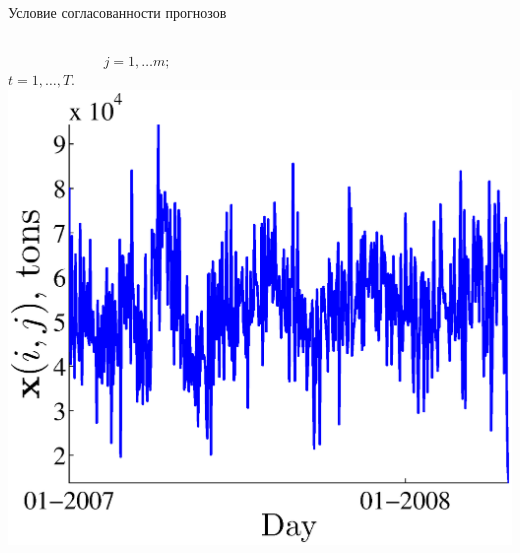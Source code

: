 \documentclass{beamer}
\begin{document}
\begin{frame}{Условие согласованности прогнозов}
\begin{columns}[c]
{        ~~~~~~~~~~~~~ {\tiny\textcolor[rgb]{0.00,0.59,0.00}{$j = 1, \ldots m;$}}  \\%
        $t = 1, \ldots, T.$
		}
       \includegraphics[width=\textwidth]{TimeSeriesExample.eps}
	\end{columns}
\end{frame}
\end{document}
